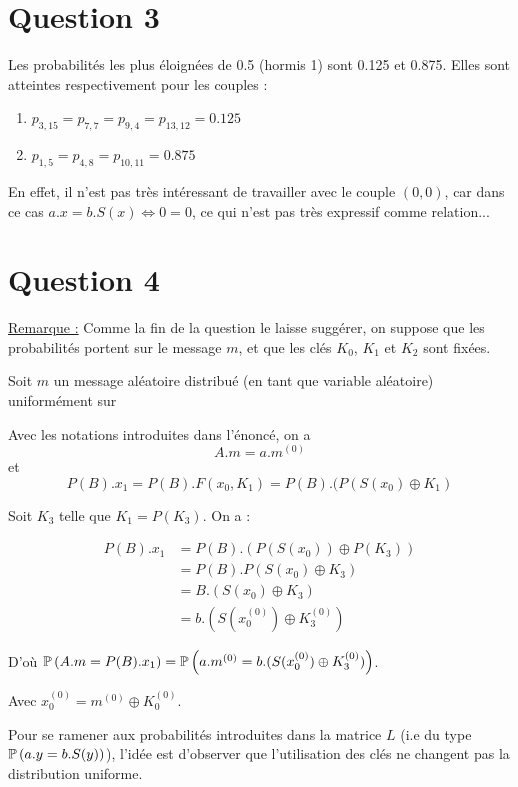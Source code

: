 \section*{Question 3}

Les probabilités les plus éloignées de 0.5 (hormis 1) sont 0.125 et 0.875.
Elles sont atteintes respectivement pour les couples :
\begin{enumerate}
\item $p_{3,15} = p_{7,7} = p_{9,4} = p_{13,12} = 0.125$
\item $p_{1,5} = p_{4,8} = p_{10,11} = 0.875$
\end{enumerate}

En effet, il n'est pas très intéressant de travailler avec le couple $(0,0)$, car dans ce cas $a.x = b.S(x) \Leftrightarrow 0 = 0$, ce qui n'est pas très expressif comme relation...

\section*{Question 4}

\underline{Remarque :} Comme la fin de la question le laisse suggérer, on suppose que les probabilités portent sur le message $m$, et que les clés $K_0$, $K_1$ et $K_2$ sont fixées.

Soit $m$ un message aléatoire distribué (en tant que variable aléatoire) uniformément sur %

Avec les notations introduites dans l'énoncé, on a \[A.m = a.m^{(0)}\] et \[P(B).x_1 = P(B).F(x_0,K_1) = P(B).(P(S(x_0)\oplus K_1)\]

Soit $K_3$ telle que $K_1 = P(K_3)$. On a :


\[
    \begin{aligned}
        P(B).x_1 &= P(B).\left (P\left (S\left (x_0\right )\right )\oplus P(K_3)\right ) \\
        &= P\left (B\right ).P\left (S\left (x_0\right ) \oplus K_3\right )\\
        &= B.\left (S\left (x_0\right ) \oplus K_3\right ) \\
        &= b.\left (S\left (x_0^{\left (0\right )}\right ) \oplus K_3^{(0)}\right )
    \end{aligned}
\]

D'où $\mathbb{P}\left( A.m = P(B).x_1 \right) = \mathbb{P}\left( a.m^{(0)}= b.(S(x_0^{(0)}) \oplus K_3^{(0)}) \right)$.

Avec $x_0^{(0)} = m^{(0)} \oplus K_0^{(0)}$.

Pour se ramener aux probabilités introduites dans la matrice $L$ (i.e du type $\mathbb{P}\left( a.y = b.S(y) \right)$), l'idée est d'observer que l'utilisation des clés ne changent pas la distribution uniforme.

